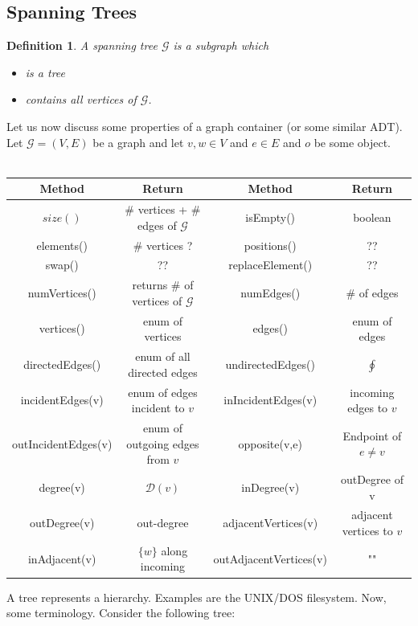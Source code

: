\documentclass[9pt]{article} %
\newtheorem*{def_}{Definition}
\newcommand{\G}{\mathcal{G}}
\begin{document}
		\subsection*{Spanning Trees}
		\begin{def_}
			A spanning tree $\G$ is a subgraph which 
			\begin{itemize}
				\item is a tree
				\item contains all vertices of $\G$.
			\end{itemize}
		\end{def_}
		
		\noindent Let us now discuss some properties of a graph container (or some similar ADT). Let $\G = (V,E)$ be a graph and let $v,w \in V$ and $e \in E$ and $o$ be some object. \\ \\
		
		\begin{tabular}{ | c | c|c | c |}
			\hline 
			Method & Return  & Method & Return \\
			\hline
			$size()$ & \# vertices + \# edges of $\G$ & isEmpty() & boolean \\
			elements() & \# vertices ? & positions() & ?? \\
			swap() & ?? & replaceElement() & ?? \\
			\hline
			numVertices() & returns \# of vertices of $\G$ & numEdges() & \# of edges \\
			vertices() & enum of vertices & edges() & enum of edges \\
			directedEdges() & enum of all directed edges & undirectedEdges() & $\oint$\\
			incidentEdges(v) & enum of edges incident to $v$ & inIncidentEdges(v) &  incoming edges to $v$ \\
			outIncidentEdges(v) & enum of outgoing edges from $v$ & opposite(v,e) & Endpoint of $e \neq v$ \\
			degree(v) &$ \mathcal{D}(v)$ & inDegree(v) & outDegree of v \\
			outDegree(v) & out-degree & adjacentVertices(v) & adjacent vertices to $v$ \\
			inAdjacent(v) & $\{ w \}$ along incoming & outAdjacentVertices(v) & ""\\
			\hline
		\end{tabular}
		
		A tree represents a hierarchy. Examples are the UNIX/DOS filesystem. Now, some terminology. Consider the following tree:
		
\end{document}
